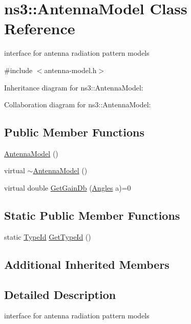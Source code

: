 \hypertarget{classns3_1_1AntennaModel}{}\section{ns3\+:\+:Antenna\+Model Class Reference}
\label{classns3_1_1AntennaModel}


interface for antenna radiation pattern models  




{\ttfamily \#include $<$antenna-\/model.\+h$>$}



Inheritance diagram for ns3\+:\+:Antenna\+Model\+:


Collaboration diagram for ns3\+:\+:Antenna\+Model\+:
\subsection*{Public Member Functions}
\begin{DoxyCompactItemize}
\item 
\hyperlink{classns3_1_1AntennaModel_ae52a9b0160ce6f813418216d7d84f955}{Antenna\+Model} ()
\item 
virtual \hyperlink{classns3_1_1AntennaModel_a7586c3c0fa38f7774f54259faad8097f}{$\sim$\+Antenna\+Model} ()
\item 
virtual double \hyperlink{classns3_1_1AntennaModel_a998f747fcd6171b6782a11297a6843d6}{Get\+Gain\+Db} (\hyperlink{structns3_1_1Angles}{Angles} a)=0
\end{DoxyCompactItemize}
\subsection*{Static Public Member Functions}
\begin{DoxyCompactItemize}
\item 
static \hyperlink{classns3_1_1TypeId}{Type\+Id} \hyperlink{classns3_1_1AntennaModel_abc7259cfbe01ca722dc843c95da66322}{Get\+Type\+Id} ()
\end{DoxyCompactItemize}
\subsection*{Additional Inherited Members}


\subsection{Detailed Description}
interface for antenna radiation pattern models 

